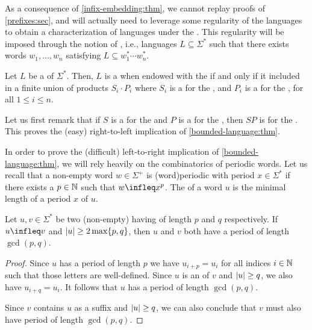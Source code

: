 \AP As a consequence of \cref{infix-embedding:thm}, we cannot replay
proofs of \cref{prefixes:sec}, and will
actually need to leverage some regularity of the languages to obtain a
characterization of  languages under the . This regularity will be imposed through the notion of , i.e., languages $L \subseteq \Sigma^*$ such that there exists words
$w_1, \dots, w_n$ satisfying $L \subseteq w_1^* \cdots w_n^*$.

\begin{theorem}[restate=bounded-language:thm,label=bounded-language:thm]
    \label{bounded-language:thm}
    Let $L$ be a  of $\Sigma^*$. Then,
    $L$ is a  when endowed with the 
     if and only if it included in a finite union of 
    products $S_i \cdot P_i$ where 
    $S_i$ is a  for the , and 
    $P_i$ is a  for the ,
    for all $1 \leq i \leq n$.
\end{theorem}

Let us first remark that if $S$ is a  for the 
and $P$ is a  for the , then $SP$ is
 for the . This proves the (easy)
right-to-left implication of \cref{bounded-language:thm}. 

\AP In order to prove the (difficult) left-to-right implication of
\cref{bounded-language:thm}, we will rely heavily on the
combinatorics of periodic words. Let us recall that a non-empty word $w \in
\Sigma^+$ is \intro(word){periodic} with period $x \in \Sigma^*$ if there
exists a $p \in \mathbb{N}$ such that $w \infleq x^p$. The  of
a word $u$ is the minimal length of a period $x$ of $u$.

\begin{lemma}
    \label{periodic-infixes:lem}
    Let $u,v \in \Sigma^*$ be two (non-empty) 
    having  of length $p$ and $q$ respectively.
    If $u \infleq v$ and $\left| u \right| \geq 2\max\{p, q\}$,
    then $u$ and $v$ both have a period of length
    $\gcd(p,q)$.
\end{lemma}
\begin{proof}
    Since $u$ has a period of length $p$ we have $u_{i+p} = u_i$ for all indices $i \in \mathbb{N}$ such that those letters are
    well-defined. Since $u$ is an  of $v$ and $\left| u \right| \geq q$, we also have $u_{i+q} = u_i$. It follows that $u$ has a period of length $\gcd(p, q)$. 
        
    Since $v$ contains $u$ as a suffix and $\left| u \right| \geq q$, we can also conclude that $v$ must also have period of length $\gcd(p,q)$.
\end{proof}


